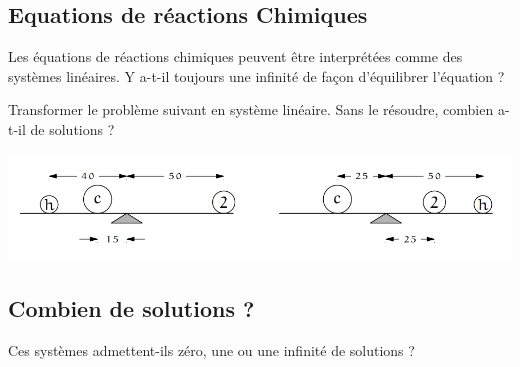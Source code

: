 \documentclass[11pt,a4paper]{report}
\begin{document}
    \subsection{Equations de réactions Chimiques}
    Les équations de réactions chimiques peuvent être interprétées comme des systèmes linéaires. \newline
    Y a-t-il toujours une infinité de façon d'équilibrer l'équation ?


    \vspace{1em}

    Transformer le problème suivant en système linéaire. Sans le résoudre, combien a-t-il de solutions ?
    \begin{center}
      \includegraphics[width=0.8\linewidth]{0-Revisions/2-PivotDeGauss/equilibre.png}
    \end{center}

    \newpage

    \vspace{2em}

    \subsection{Combien de solutions ?}
Ces systèmes admettent-ils zéro, une ou une infinité de solutions ?
\end{document}
